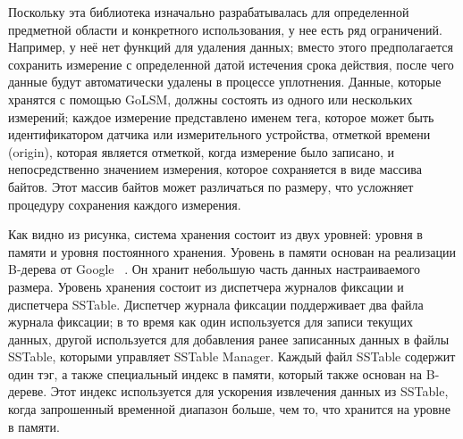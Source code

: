 Поскольку эта библиотека изначально разрабатывалась для определенной предметной области и конкретного использования, у нее есть ряд ограничений. Например, у неё нет функций для удаления данных; вместо этого предполагается сохранить измерение с определенной датой истечения срока действия, после чего данные будут автоматически удалены в процессе уплотнения. Данные, которые хранятся с помощью GoLSM, должны состоять из одного или нескольких измерений; каждое измерение представлено именем тега, которое может быть идентификатором датчика или измерительного устройства, отметкой времени (origin), которая является отметкой, когда измерение было записано, и непосредственно значением измерения, которое сохраняется в виде массива байтов. Этот массив байтов может различаться по размеру, что усложняет процедуру сохранения каждого измерения.

Как видно из рисунка, система хранения состоит из двух уровней: уровня в памяти и уровня постоянного хранения. Уровень в памяти основан на реализации B-дерева от Google ~\cite{btree_google}. Он хранит небольшую часть данных настраиваемого размера. Уровень хранения состоит из диспетчера журналов фиксации и диспетчера SSTable. Диспетчер журнала фиксации поддерживает два файла журнала фиксации; в то время как один используется для записи текущих данных, другой используется для добавления ранее записанных данных в файлы SSTable, которыми управляет SSTable Manager. Каждый файл SSTable содержит один тэг, а также специальный индекс в памяти, который также основан на B-дереве. Этот индекс используется для ускорения извлечения данных из SSTable, когда запрошенный временной диапазон больше, чем то, что хранится на уровне в памяти.